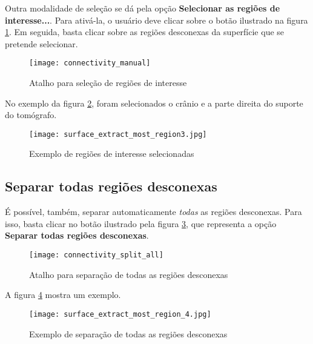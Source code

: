Outra modalidade de seleção se dá pela opção \textbf{Selecionar as regiões de interesse...}.
Para ativá-la, o usuário deve clicar sobre o botão ilustrado na figura
\ref{fig:short_connectivity_manual}. Em seguida, basta clicar sobre as regiões desconexas
da superfície que se pretende selecionar.

\begin{figure}[!htb]
\centering
\texttt{[image: connectivity\_manual]}
\caption{Atalho para seleção de regiões de interesse}
\label{fig:short_connectivity_manual}
\end{figure}

No exemplo da figura \ref{fig:extract_most_region3}, foram selecionados o crânio e a parte
direita do suporte do tomógrafo.

\begin{figure}[!htb]
\centering
\texttt{[image: surface\_extract\_most\_region3.jpg]}
\caption{Exemplo de regiões de interesse selecionadas}
\label{fig:extract_most_region3}
\end{figure}


\subsection{Separar todas regiões desconexas}

É possível, também, separar automaticamente \textit{todas} as regiões desconexas. Para
isso, basta clicar no botão ilustrado pela figura \ref{fig:connectivity_split_all}, que
representa a opção \textbf{Separar todas regiões desconexas}.

\begin{figure}[!htb]
\centering
\texttt{[image: connectivity\_split\_all]}
\caption{Atalho para separação de todas as regiões desconexas}
\label{fig:connectivity_split_all}
\end{figure}

A figura \ref{fig:extrac_most_region_4} mostra um exemplo.

\begin{figure}[!htb]
\centering
\texttt{[image: surface\_extract\_most\_region\_4.jpg]}
\caption{Exemplo de separação de todas as regiões desconexas}
\label{fig:extrac_most_region_4}
\end{figure}

